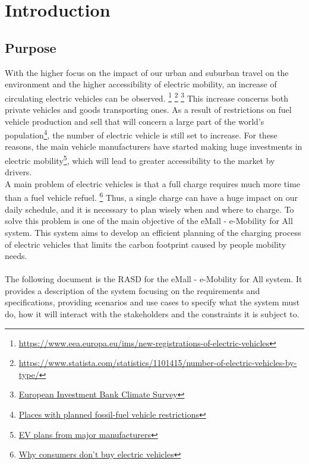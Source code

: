 \section{Introduction}\label{intro}
\subsection{Purpose}
With the higher focus on the impact of our urban and suburban travel on the environment and the higher accessibility of electric mobility, an increase of circulating electric vehicles can be observed.
\footnote{\url{https://www.eea.europa.eu/ims/new-registrations-of-electric-vehicles}} \footnote{\url{https://www.statista.com/statistics/1101415/number-of-electric-vehicles-by-type/}} \footnote{\href{https://www.eib.org/en/surveys/climate-survey/4th-climate-survey/hybrid-electric-petrol-cars-flying-holidays-climate.htm}{European Investment Bank Climate Survey}}
This increase concerns both private vehicles and goods transporting ones.
As a result of restrictions on fuel vehicle production and sell that will concern a large part of the world's population\footnote{\href{https://en.wikipedia.org/wiki/Phase-out\_of\_fossil\_fuel\_vehicles\#Places\_with\_planned\_fossil-fuel\_vehicle\_restrictions}{Places with planned fossil-fuel vehicle restrictions}}, the number of
electric vehicle is still set to increase. For these reasons, the main vehicle manufacturers have started making huge investments in electric mobility\footnote{\href{https://en.wikipedia.org/wiki/Electric\_car\#EV\_plans\_from\_major\_manufacturers}{EV plans from major manufacturers}}, which will lead to greater accessibility to the market by drivers.\\
A main problem of electric vehicles is that a full charge requires much more time than a fuel vehicle refuel.
\footnote{\href{https://blinkcharging.com/fact-from-fiction-the-real-reason-why-consumers-dont-buy-electric-vehicles/?locale=en}{Why consumers don't buy electric vehicles}}
Thus, a single charge can have a huge impact on our daily schedule, and it is necessary to plan wisely when and where to charge.
To solve this problem is one of the main objective of the eMall - e-Mobility for All system.
This system aims to develop an efficient planning of the charging process of electric vehicles that limits the carbon footprint caused by people mobility needs.\\\\
The following document is the RASD for the eMall - e-Mobility for All system. It provides
a description of the system focusing on the requirements and specifications, providing scenarios and use cases
to specify what the system must do, how it will interact with the stakeholders and the constraints it is subject to.

